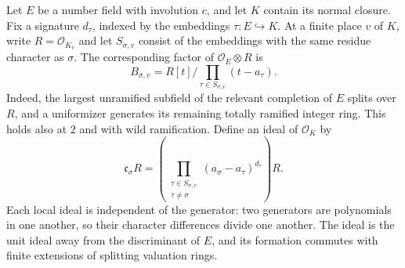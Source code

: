 Let $E$ be a number field with involution $c$, and let $K$ contain
its normal closure. Fix a signature $d_\tau$, indexed by the
embeddings $\tau:E\hookrightarrow K$. At a finite place $v$ of $K$,
write $R=\mathcal O_{K_v}$ and let $S_{\sigma,v}$ consist of the
embeddings with the same residue character as $\sigma$.
The corresponding factor of $\mathcal O_E\otimes R$ is
\[
 B_{\sigma,v}=R[t]/\prod_{\tau\in S_{\sigma,v}}(t-a_\tau).
\]
Indeed, the largest unramified subfield of the relevant completion of
$E$ splits over $R$, and a uniformizer generates its remaining totally
ramified integer ring. This holds also at $2$ and with wild ramification.
\cite[Proposition 7.50, Corollary 7.51, Proposition 7.55 and
Remark 7.56]{milne-ant}
Define an ideal of $\mathcal O_K$ by
\begin{equation}\label{geo-signature-correction-ideal}
 \mathfrak c_\sigma R
   =\left(\prod_{\substack{\tau\in S_{\sigma,v}\\\tau\ne\sigma}}
                   (a_\sigma-a_\tau)^{d_\tau}\right)R.
\end{equation}
Each local ideal is independent of the generator: two generators
are polynomials in one another, so their character differences divide
one another. The ideal is the unit ideal away from the discriminant
of $E$, and its formation commutes with finite extensions of splitting
valuation rings.

